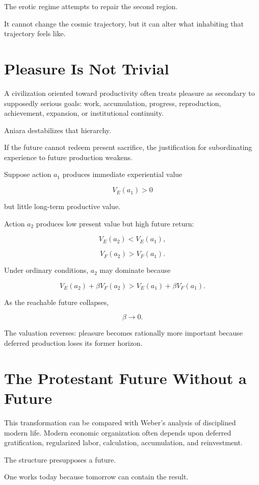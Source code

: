 \documentclass[11pt,oneside]{book}
\theoremstyle{definition}
\theoremstyle{remark}
\begin{document}
The erotic regime attempts to repair the second region.

It cannot change the cosmic trajectory, but it can alter what inhabiting that trajectory feels like.

\section{Pleasure Is Not Trivial}

A civilization oriented toward productivity often treats pleasure as secondary to supposedly serious goals: work, accumulation, progress, reproduction, achievement, expansion, or institutional continuity.

Aniara destabilizes that hierarchy.

If the future cannot redeem present sacrifice, the justification for subordinating experience to future production weakens.

Suppose action \(a_1\) produces immediate experiential value

\[
V_E(a_1)>0
\]

but little long-term productive value.

Action \(a_2\) produces low present value but high future return:

\[
V_E(a_2)<V_E(a_1),
\]

\[
V_F(a_2)>V_F(a_1).
\]

Under ordinary conditions, \(a_2\) may dominate because

\[
V_E(a_2)+\beta V_F(a_2)
>
V_E(a_1)+\beta V_F(a_1).
\]

As the reachable future collapses,

\[
\beta\rightarrow0.
\]

The valuation reverses: pleasure becomes rationally more important because deferred production loses its former horizon.

\section{The Protestant Future Without a Future}

This transformation can be compared with Weber's analysis of disciplined modern life. Modern economic organization often depends upon deferred gratification, regularized labor, calculation, accumulation, and reinvestment.

The structure presupposes a future.

One works today because tomorrow can contain the result.
\end{document}
